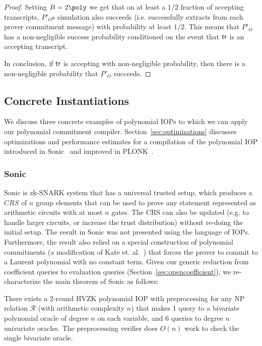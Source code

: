 \begin{proof}
Setting $B = 2 \poly$ we get that on at least a $1/2$ fraction of accepting transcripts, $P'_O$s simulation also succeeds (i.e. successfully extracts from each prover commitment message) with probability at least $1/2$. This means that $P'_O$ has a non-negligible success probability conditioned on the event that $\textsf{{tr}}$ is an accepting transcript. 

In conclusion, if $\textsf{{tr}}$ is accepting with non-negligible probability, then there is a non-negligible probability that $P'_O$ succeeds. 


\end{proof}

\subsection{Concrete Instantiations} 
We discuss three concrete examples of polynomial IOPs to which we can apply our polynomial commitment compiler. Section~\ref{sec:optimizations} discusses optimizations and performance estimates for a compilation of the polynomial IOP introduced in \textsf{Sonic}~\cite{Sonic} and improved in \textsf{PLONK}~\cite{Plonk}. 

\subsubsection{Sonic} 
\textsf{Sonic} is zk-SNARK system that has a universal trusted setup, which produces a $CRS$ of $n$ group elements that can be used to prove any statement represented as arithmetic circuits with at most $n$ gates. The CRS can also be updated (e.g. to handle larger circuits, or increase the trust distribution) without re-doing the initial setup. The result in \textsf{Sonic} was not presented using the language of IOPs. Furthermore, the result also relied on a special construction of polynomial commitments (a modification of Kate et. al.~\cite{AC:KatZavGol10}) that forces the prover to commit to a Laurent polynomial with no constant term. Given our generic reduction from coefficient queries to evaluation queries (Section~\ref{sec:opencoefficient}), we re-characterize the main theorem of \textsf{Sonic} as follows: 

\begin{theorem}
There exists a 2-round HVZK polynomial IOP with preprocessing for any NP relation $\mathcal{R}$ (with arithmetic complexity $n$) that makes 1 query to a bivariate polynomial oracle of degree $n$ on each variable, and 6 queries to degree $n$ univariate oracles. The preprocessing verifier does $O(n)$ work to check the single bivariate oracle. 
\end{theorem}

